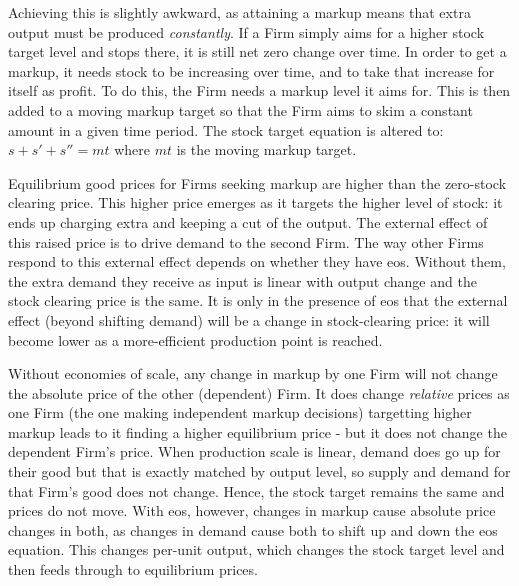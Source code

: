 Achieving this is slightly awkward, as attaining a markup means that extra output must be produced \emph{constantly}. If a Firm simply aims for a higher stock target level and stops there, it is still net zero change over time. In order to get a markup, it needs stock to be increasing over time, and to take that increase for itself as profit. To do this, the Firm needs a markup level it aims for. This is then added to a moving markup target so that the Firm aims to skim a constant amount in a given time period. The stock target equation is altered to: $s + s' + s'' = mt$ where $mt$ is the moving markup target.

Equilibrium good prices for Firms seeking markup are higher than the zero-stock clearing price. This higher price emerges as it targets the higher level of stock: it ends up charging extra and keeping a cut of the output. The external effect of this raised price is to drive demand to the second Firm. The way other Firms respond to this external effect depends on whether they have \gls{eos}. Without them, the extra demand they receive as input is linear with output change and the stock clearing price is the same. It is only in the presence of \gls{eos} that the external effect (beyond shifting demand) will be a change in stock-clearing price: it will become lower as a more-efficient production point is reached. 

Without economies of scale, any change in markup by one Firm will not change the absolute price of the other (dependent) Firm. It does change \emph{relative} prices as one Firm (the one making independent markup decisions) targetting higher markup leads to it finding a  higher equilibrium price - but it does not change the dependent Firm's price. When production scale is linear, demand does go up for their good but that is exactly matched by output level, so supply and demand for that Firm's good does not change.  Hence, the stock target remains the same and prices do not move. With \gls{eos}, however, changes in markup cause absolute price changes in both, as changes in demand cause both to shift up and down the \gls{eos} equation. This changes per-unit output, which changes the stock target level and then feeds through to equilibrium prices.

